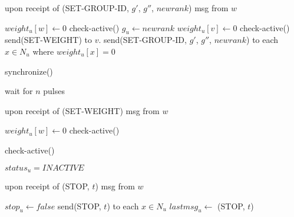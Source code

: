 \documentclass{acm_proc_article-sp}
\begin{document}
\begin{algorithm}                      \caption{upon receipt of (SET-GROUP-ID, $g'$, $g''$, $newrank$) msg from $w$}   \label{alg16}                           \begin{algorithmic}
\STATE{}
\STATE $weight_{u}[w]\leftarrow 0$
\STATE check-active()
\STATE $g_{u}\leftarrow newrank$
\STATE $weight_{u}[v]\leftarrow 0$
\STATE check-active()
\STATE send(SET-WEIGHT) to $v$. 
\ENDIF
\ENDFOR
\ENDIF
\STATE send(SET-GROUP-ID, $g'$, $g''$, $newrank$) to each $x \in N_{u}$ where $weight_{u}[x]=0$
\ENDIF
\end{algorithmic}
\end{algorithm}

\begin{algorithm}                      \caption{synchronize()}   \label{alg17}                           \begin{algorithmic}
\STATE{}
\STATE wait for $n$ pulses
\end{algorithmic}
\end{algorithm}

\newpage

\begin{algorithm}                      \caption{upon receipt of (SET-WEIGHT) msg from $w$}   \label{alg18}                           \begin{algorithmic}
\STATE $weight_{u}[w]\leftarrow 0$
\STATE check-active()
\end{algorithmic}
\end{algorithm}

\begin{algorithm}                      \caption{check-active()}   \label{alg19}                           \begin{algorithmic}
\STATE $status_{u}=INACTIVE$
\ENDIF
\end{algorithmic}
\end{algorithm}

\begin{algorithm}                      \caption{upon receipt of (STOP, $t$) msg from $w$}   \label{alg20}                           \begin{algorithmic}
\STATE{}
\STATE $stop_{u}\leftarrow false$
\STATE send(STOP, $t$) to each $x\in N_{u}$
\STATE $lastmsg_{u}\leftarrow$ (STOP, $t$)
\ENDIF
\ENDIF
\end{algorithmic}
\end{algorithm}
\end{document}
